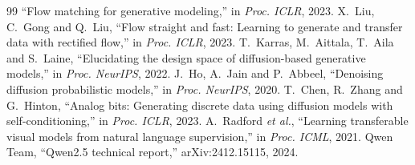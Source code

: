 \documentclass[11pt,a4paper]{article}
\begin{document}
\begin{thebibliography}{99}
  ``Flow matching for generative modeling,'' in \emph{Proc. ICLR}, 2023.
 X.~Liu, C.~Gong and Q.~Liu,
  ``Flow straight and fast: Learning to generate and transfer data with rectified flow,'' in \emph{Proc. ICLR}, 2023.
 T.~Karras, M.~Aittala, T.~Aila and S.~Laine,
  ``Elucidating the design space of diffusion-based generative models,'' in \emph{Proc. NeurIPS}, 2022.
 J.~Ho, A.~Jain and P.~Abbeel,
  ``Denoising diffusion probabilistic models,'' in \emph{Proc. NeurIPS}, 2020.
 T.~Chen, R.~Zhang and G.~Hinton,
  ``Analog bits: Generating discrete data using diffusion models with self-conditioning,'' in \emph{Proc. ICLR}, 2023.
 A.~Radford \emph{et al.},
  ``Learning transferable visual models from natural language supervision,'' in \emph{Proc. ICML}, 2021.
 Qwen Team, ``Qwen2.5 technical report,'' arXiv:2412.15115, 2024.
\end{thebibliography}
\end{document}
